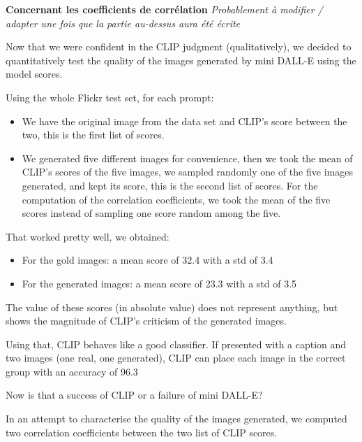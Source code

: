\documentclass{article}
\begin{document}
\textbf{Concernant les coefficients de corrélation}
\textit{Probablement à modifier / adapter une fois que la partie au-dessus aura été écrite}

Now that we were confident in the CLIP judgment (qualitatively), we decided to quantitatively test the quality of the images generated by mini DALL-E using the model scores. 

Using the whole Flickr test set, for each prompt: 

\begin{itemize}
    \item We have the original image from the data set and CLIP's score between the two, this is the first list of scores.
    \item We generated five different images for convenience, then we took the mean of CLIP's scores of the five images, we sampled randomly one of the five images generated, and kept its score, this is the second list of scores. For the computation of the correlation coefficients, we took the mean of the five scores instead of sampling one score random among the five. 
\end{itemize}

That worked pretty well, we obtained:
\begin{itemize}
    \item For the gold images: a mean score of 32.4 with a std of 3.4
    \item For the generated images: a mean score of 23.3 with a std of 3.5
\end{itemize}

The value of these scores (in absolute value) does not represent anything, but shows the magnitude of CLIP's criticism of the generated images.

Using that, CLIP behaves like a good classifier. If presented with a caption and two images (one real, one generated), CLIP can place each image in the correct group with an accuracy of 96.3%

Now is that a success of CLIP or a failure of mini DALL-E?

In an attempt to characterise the quality of the images generated, we computed two correlation coefficients between the two list of CLIP scores.
\end{document}
